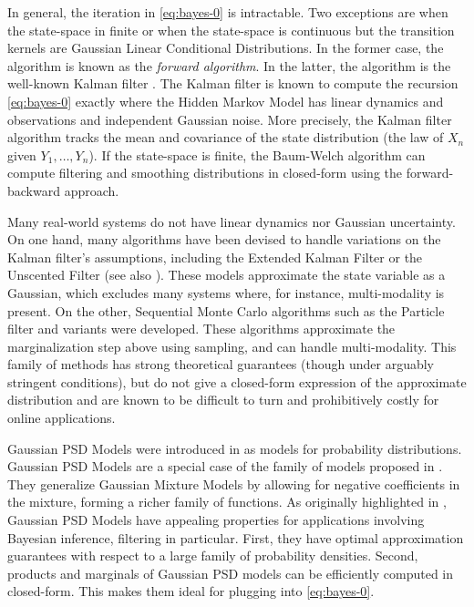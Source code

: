 In general, the iteration in \cref{eq:bayes-0} is intractable. Two exceptions are when the state-space in finite or when the state-space is continuous but the transition kernels are Gaussian Linear Conditional Distributions. In the former case, the algorithm is known as the \textit{forward algorithm}. In the latter, the algorithm is the well-known Kalman filter \cite{kalman-bucy}. The Kalman filter is known to compute the recursion \cref{eq:bayes-0} exactly where the Hidden Markov Model has linear dynamics and observations and independent Gaussian noise. More precisely, the Kalman filter algorithm tracks the mean and covariance of the state distribution (the law of $X_n$ given $Y_1, \ldots, Y_n$).
If the state-space is finite, the Baum-Welch algorithm can compute filtering and smoothing distributions in closed-form using the forward-backward approach.

Many real-world systems do not have linear dynamics nor Gaussian uncertainty. On one hand, many algorithms have been devised to handle variations on the Kalman filter's assumptions, including the Extended Kalman Filter or the Unscented Filter \citep{ukf} (see also \cite{sarkka}). These models approximate the state variable as a Gaussian, which excludes many systems where, for instance, multi-modality is present. On the other, Sequential Monte Carlo algorithms such as the Particle filter and variants were developed. These algorithms approximate the marginalization step above using sampling, and can handle multi-modality. This family of methods has strong theoretical guarantees (though under arguably stringent conditions), but do not give a closed-form expression of the approximate distribution and are known to be difficult to turn and prohibitively costly for online applications.

Gaussian PSD Models were introduced in \cite{ciliberto2021} as models for probability distributions. Gaussian PSD Models are a special case of the family of models proposed in \cite{ulysse-non-negative}. They generalize Gaussian Mixture Models by allowing for negative coefficients in the mixture, forming a richer family of functions. As originally highlighted in \cite{ciliberto2021}, Gaussian PSD Models have appealing properties for applications involving Bayesian inference, filtering in particular. First, they have optimal approximation guarantees with respect to a large family of probability densities. Second, products and marginals of Gaussian PSD models can be efficiently computed in closed-form. This makes them ideal for plugging into \cref{eq:bayes-0}.


